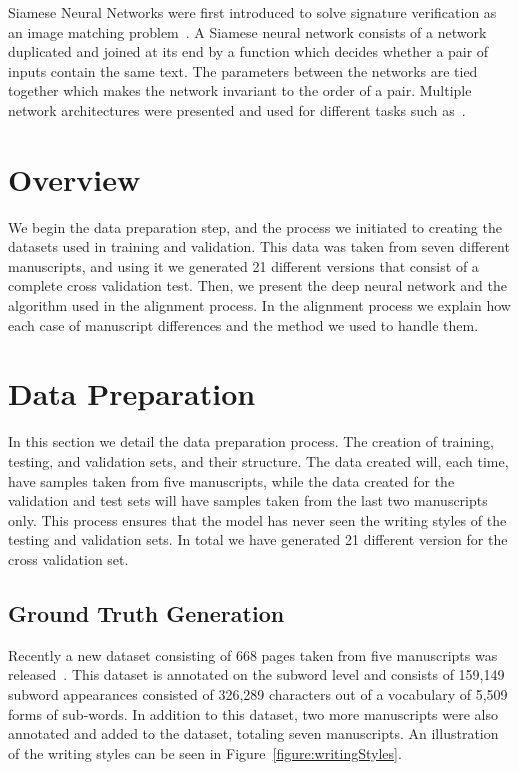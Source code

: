 \documentclass[10pt, a4paper, conference, compsocconf]{IEEEtran}
\begin{document}
Siamese Neural Networks were first introduced to solve signature verification as an image matching problem~\cite{bromley1993signature}. A Siamese neural network consists of a network duplicated and joined at its end by a function which decides whether a pair of inputs contain the same text. The parameters between the networks are tied together which makes the network invariant to the order of a pair. Multiple network architectures were presented and used for different tasks such as~\cite{chopra2005learning, koch2015siamese, bertinetto2016fully}.
\section{Overview}
We begin the data preparation step, and the process we initiated to creating the datasets used in training and validation. This data was taken from seven different manuscripts, and using it we generated 21 different versions that consist of a complete cross validation test. Then, we present the deep neural network and the algorithm used in the alignment process. In the alignment process we explain how each case of manuscript differences and the method we used to handle them.
\section{Data Preparation}
In this section we detail the data preparation process. The creation of training, testing, and validation sets, and their structure. The data created will, each time, have samples taken from five manuscripts, while the data created for the validation and test sets will have samples taken from the last two manuscripts only. This process ensures that the model has never seen the writing styles of the testing and validation sets. In total we have generated 21 different version for the cross validation set.

\subsection{Ground Truth Generation}
Recently a new dataset consisting of 668 pages taken from five manuscripts was released~\cite{kassis2017vmlhd}. This dataset is annotated on the subword level and consists of 159,149 subword appearances consisted of 326,289 characters out of a vocabulary of 5,509 forms of sub-words. In addition to this dataset, two more manuscripts were also annotated and added to the dataset, totaling seven manuscripts. An illustration of the writing styles can be seen in Figure~\ref{figure:writingStyles}.
\end{document}
